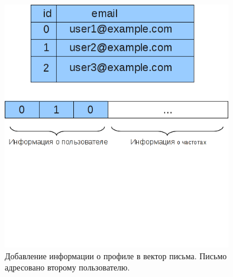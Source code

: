 \begin{figure}[h]
\begin{center}
\includegraphics[width=10cm]{img/add_uid}
\end{center}
\caption{Добавление информации о профиле в вектор письма. Письмо адресовано второму пользователю.}
\label{multiprofile}
\end{figure}

